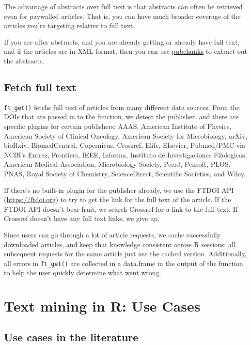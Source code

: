 \documentclass[author-year, review, 11pt]{components/elsarticle} %
\begin{document}
The advantage of abstracts over full text is that abstracts can often be
retrieved even for paywalled articles. That is, you can have much
broader coverage of the articles you're targeting relative to full text.

If you are after abstracts, and you are already getting or already have
full text, and if the articles are in XML format, then you can use
\href{https://github.com/ropensci/pubchunks}{pubchunks} to extract out
the abstracts.

\hypertarget{fetch-full-text}{%
\subsection{Fetch full text}\label{fetch-full-text}}

\texttt{ft\_get()} fetchs full text of articles from many different data
sources. From the DOIs that are passed in to the function, we detect the
publisher, and there are specific plugins for certain publishers: AAAS,
American Institute of Physics, American Society of Clinical Oncology,
American Society for Microbiology, arXiv, bioRxiv, BiomedCentral,
Copernicus, Crossref, Elife, Elsevier, Pubmed/PMC via NCBI's Entrez,
Frontiers, IEEE, Informa, Instituto de Investigaciones Filologicas,
American Medical Association, Microbiology Society, PeerJ, Pensoft,
PLOS, PNAS, Royal Society of Chemistry, ScienceDirect, Scientific
Societies, and Wiley.

If there's no built-in plugin for the publisher already, we use the
FTDOI API (\url{https://ftdoi.org}) to try to get the link for the full
text of the article. If the FTDOI API doesn't bear fruit, we search
Crossref for a link to the full text. If Crossref doesn't have any full
text links, we give up.

Since users can go through a lot of article requests, we cache
successfully downloaded articles, and keep that knowledge consistent
across R sessions; all subsequent requests for the same article just use
the cached version. Additionally, all errors in \texttt{ft\_get()} are
collected in a data.frame in the output of the function to help the user
quickly determine what went wrong.

\hypertarget{text-mining-in-r-use-cases}{%
\section{Text mining in R: Use Cases}\label{text-mining-in-r-use-cases}}

\hypertarget{use-cases-in-the-literature}{%
\subsection{Use cases in the
literature}\label{use-cases-in-the-literature}}
\end{document}

